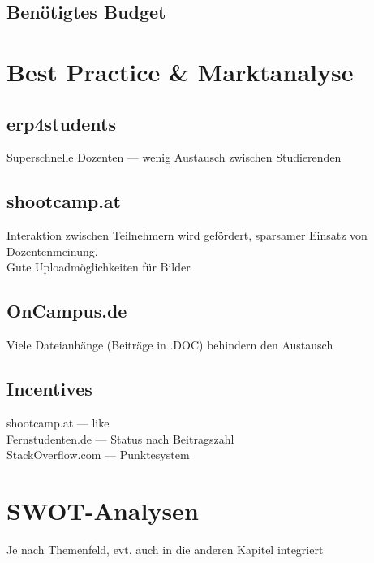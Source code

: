\subsection{Benötigtes Budget} %
\label{sub:benotigtes_budget}



\section{Best Practice \& Marktanalyse} %
\label{sec:best_practice}

\subsection{erp4students} %
\label{sub:erp4students}
Superschnelle Dozenten --- wenig Austausch zwischen Studierenden

\subsection{shootcamp.at} %
\label{sub:shootcamp_at}
Interaktion zwischen Teilnehmern wird gefördert, sparsamer Einsatz von Dozentenmeinung.\\
Gute Uploadmöglichkeiten für Bilder

\subsection{OnCampus.de} %
\label{sub:oncampus_de}
Viele Dateianhänge (Beiträge in .DOC) behindern den Austausch

\subsection{Incentives} %
\label{sub:infentives}
shootcamp.at --- like\\
Fernstudenten.de --- Status nach Beitragszahl\\
StackOverflow.com --- Punktesystem


\section{SWOT-Analysen} %
\label{sec:swot_analysen}
Je nach  Themenfeld, evt. auch in die anderen Kapitel integriert
